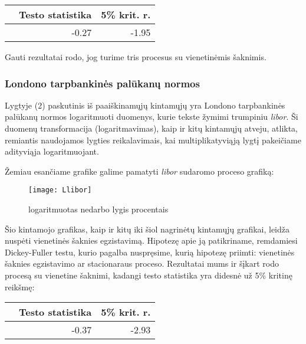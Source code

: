 \documentclass[a4paper]{article}
\begin{document}
\begin{table}[!h]
\begin{center}
\begin{tabular}{rrr}
  \hline
 & Testo statistika & 5\% krit. r. \\ 
  \hline
 & -0.27 & -1.95 \\ 
   \hline
\end{tabular}
\end{center}
\end{table}

\indent Gauti rezultatai rodo, jog turime tris procesus su vienetinėmis šaknimis.

\newpage \subsubsection{Londono tarpbankinės palūkanų normos} \indent

Lygtyje (2) paskutinis iš paaiškinamųjų kintamųjų yra Londono tarpbankinės palūkanų
normos logaritmuoti duomenys, kurie tekste žymimi trumpiniu \textit{libor}. Ši duomenų transformacija (logaritmavimas), kaip ir kitų kintamųjų atveju, atlikta, remiantis naudojamos lygties reikalavimais, kai multiplikatyviąją lygtį pakeičiame adityviąja logaritmuojant.

Žemiau esančiame grafike galime pamatyti \textit{libor} sudaromo proceso grafiką:

\begin{figure}[!h]
\centering
\texttt{[image: Llibor]}
\caption{logaritmuotas nedarbo lygis procentais}
\end{figure}

Šio kintamojo grafikas, kaip ir kitų iki šiol nagrinėtų kintamųjų grafikai, leidža nuspėti vienetinės šaknies egzistavimą. Hipotezę apie ją patikriname, remdamiesi Dickey-Fuller testu, kurio pagalba nuspręsime, kurią hipotezę priimti: vienetinės šaknies egzistavimo ar stacionaraus proceso. Rezultatai mums ir šįkart rodo procesą su vienetine šaknimi, kadangi testo statistika yra didesnė už 5\% kritinę reikšmę:

\begin{table}[!h]
\begin{center}
\begin{tabular}{rrr}
  \hline
 & Testo statistika & 5\% krit. r. \\ 
  \hline
 & -0.37 & -2.93 \\ 
   \hline
\end{tabular}
\end{center}
\end{table}
\end{document}
